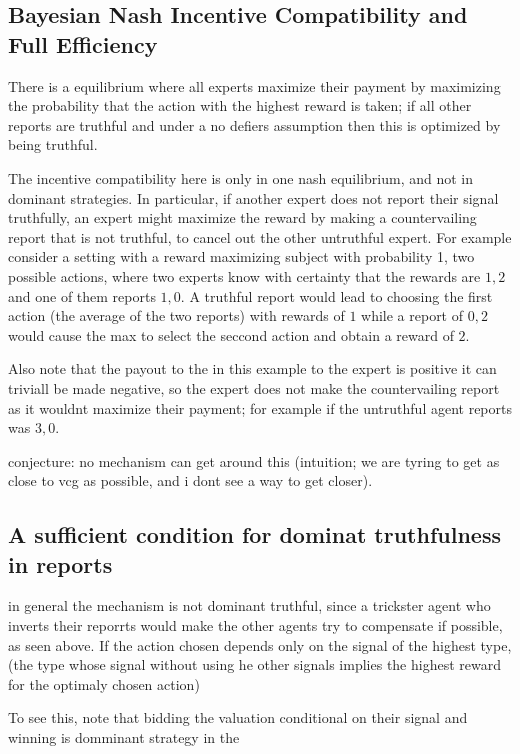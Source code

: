 \subsection{Bayesian Nash Incentive Compatibility and Full Efficiency}

There is a  equilibrium where all experts maximize their payment by maximizing the probability that the action with the highest reward is taken; if all other reports are truthful and under a no defiers assumption then this is optimized by being truthful.


The incentive compatibility here is only in one nash equilibrium, and not in dominant strategies. In particular, if another expert does not report their signal truthfully, an expert might maximize the reward by making a countervailing report that is not truthful, to cancel out the other untruthful expert. For example consider a setting with a reward maximizing subject with probability 1, two possible actions, where two experts know with certainty that the rewards are $1,2$ and one of them reports $1,0$. A truthful report would lead to choosing the first action (the average of the two reports) with rewards of $1$ while a report of $0,2$ would cause the max to select the seccond action and obtain a reward of $2$.

Also note that the payout to the in this example to the expert is positive it can triviall be made negative, so the expert does not make the countervailing report as it wouldnt maximize their payment; for example if the untruthful agent reports was $3,0$.

conjecture: no mechanism can get around this (intuition; we are tyring to get as close to vcg as possible, and i dont see a way to get closer).


\subsection{A sufficient condition for dominat truthfulness in reports}

in general the mechanism is not dominant truthful, since a trickster agent who inverts their reporrts would make the other agents try to compensate if possible, as seen above.
If the action chosen depends only on the signal of the highest type, (the type whose signal without using he other signals implies the highest reward for the optimaly chosen action) 

To see this, note that bidding the valuation conditional on their signal and winning is domminant strategy in the 

